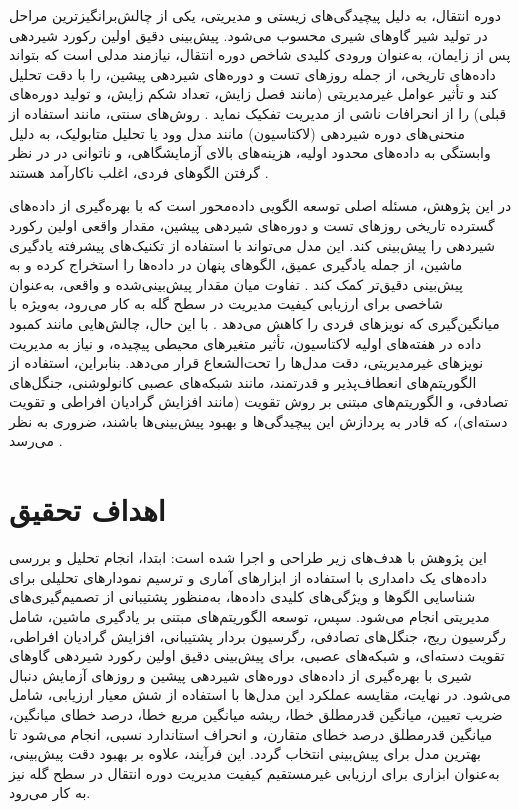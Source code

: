 دوره انتقال، به دلیل پیچیدگی‌های زیستی و مدیریتی، یکی از چالش‌برانگیزترین مراحل در تولید شیر گاوهای شیری محسوب می‌شود. پیش‌بینی دقیق اولین رکورد شیردهی پس از زایمان، به‌عنوان ورودی کلیدی شاخص دوره انتقال، نیازمند مدلی است که بتواند داده‌های تاریخی، از جمله روزهای تست  و دوره‌های شیردهی پیشین، را با دقت تحلیل کند و تأثیر عوامل غیرمدیریتی (مانند فصل زایش، تعداد شکم زایش، و تولید دوره‌های قبلی) را از انحرافات ناشی از مدیریت تفکیک نماید \cite{Salamone2022, Dallago2019, Liseune2023}. روش‌های سنتی، مانند استفاده از منحنی‌های دوره شیردهی (لاکتاسیون) مانند مدل وود یا تحلیل متابولیک، به دلیل وابستگی به داده‌های محدود اولیه، هزینه‌های بالای آزمایشگاهی، و ناتوانی در در نظر گرفتن الگوهای فردی، اغلب ناکارآمد هستند \cite{GuevaraEscobar2022, Wood1967}.

در این پژوهش، مسئله اصلی توسعه الگویی داده‌محور است که با بهره‌گیری از داده‌های گسترده تاریخی روزهای تست و دوره‌های شیردهی پیشین، مقدار واقعی اولین رکورد شیردهی را پیش‌بینی کند. این مدل می‌تواند با استفاده از تکنیک‌های پیشرفته یادگیری ماشین، از جمله یادگیری عمیق، الگوهای پنهان در داده‌ها را استخراج کرده و به پیش‌بینی دقیق‌تر کمک کند \cite{Liseune2023}. تفاوت میان مقدار پیش‌بینی‌شده و واقعی، به‌عنوان شاخصی برای ارزیابی کیفیت مدیریت در سطح گله به کار می‌رود، به‌ویژه با میانگین‌گیری که نویزهای فردی را کاهش می‌دهد \cite{Nordlund2006}. با این حال، چالش‌هایی مانند کمبود داده در هفته‌های اولیه لاکتاسیون، تأثیر متغیرهای محیطی پیچیده، و نیاز به مدیریت نویزهای غیرمدیریتی، دقت مدل‌ها را تحت‌الشعاع قرار می‌دهد. بنابراین، استفاده از الگوریتم‌های انعطاف‌پذیر و قدرتمند، مانند شبکه‌های عصبی کانولوشنی، جنگل‌های تصادفی، و الگوریتم‌های مبتنی بر روش تقویت (مانند افزایش گرادیان افراطی و تقویت دسته‌ای)، که قادر به پردازش این پیچیدگی‌ها و بهبود پیش‌بینی‌ها باشند، ضروری به نظر می‌رسد \cite{Adriaens2021, Salamone2022}.

\section{اهداف تحقیق}

این پژوهش با هدف‌های زیر طراحی و اجرا شده است: ابتدا، انجام تحلیل و بررسی داده‌های یک دامداری با استفاده از ابزارهای آماری و ترسیم نمودارهای تحلیلی برای شناسایی الگوها و ویژگی‌های کلیدی داده‌ها، به‌منظور پشتیبانی از تصمیم‌گیری‌های مدیریتی انجام می‌شود. سپس، توسعه الگوریتم‌های مبتنی بر یادگیری ماشین، شامل رگرسیون ریج، جنگل‌های تصادفی، رگرسیون بردار پشتیبانی، افزایش گرادیان افراطی، تقویت دسته‌ای، و شبکه‌های عصبی، برای پیش‌بینی دقیق اولین رکورد شیردهی گاوهای شیری با بهره‌گیری از داده‌های دوره‌های شیردهی پیشین و روزهای آزمایش دنبال می‌شود. در نهایت، مقایسه عملکرد این مدل‌ها با استفاده از شش معیار ارزیابی، شامل ضریب تعیین، میانگین قدرمطلق خطا، ریشه میانگین مربع خطا، درصد خطای میانگین، میانگین قدرمطلق درصد خطای متقارن، و انحراف استاندارد نسبی، انجام می‌شود تا بهترین مدل برای پیش‌بینی انتخاب گردد. این فرآیند، علاوه بر بهبود دقت پیش‌بینی، به‌عنوان ابزاری برای ارزیابی غیرمستقیم کیفیت مدیریت دوره انتقال در سطح گله نیز به کار می‌رود.

